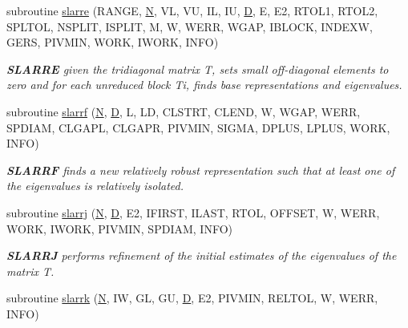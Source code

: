 \begin{DoxyCompactItemize}
subroutine \hyperlink{group__auxOTHERauxiliary_ga4a2b9dcf8e9c8f368fb6d39506781f46}{slarre} (R\+A\+N\+G\+E, \hyperlink{polmisc_8c_a0240ac851181b84ac374872dc5434ee4}{N}, V\+L, V\+U, I\+L, I\+U, \hyperlink{odrpack_8h_a7dae6ea403d00f3687f24a874e67d139}{D}, E, E2, R\+T\+O\+L1, R\+T\+O\+L2, S\+P\+L\+T\+O\+L, N\+S\+P\+L\+I\+T, I\+S\+P\+L\+I\+T, M, W, W\+E\+R\+R, W\+G\+A\+P, I\+B\+L\+O\+C\+K, I\+N\+D\+E\+X\+W, G\+E\+R\+S, P\+I\+V\+M\+I\+N, W\+O\+R\+K, I\+W\+O\+R\+K, I\+N\+F\+O)
\begin{DoxyCompactList}\small\item\em {\bfseries S\+L\+A\+R\+R\+E} given the tridiagonal matrix T, sets small off-\/diagonal elements to zero and for each unreduced block Ti, finds base representations and eigenvalues. \end{DoxyCompactList}\item 
subroutine \hyperlink{group__auxOTHERauxiliary_gaaf557670fb7f0616fb74b6af8cae353b}{slarrf} (\hyperlink{polmisc_8c_a0240ac851181b84ac374872dc5434ee4}{N}, \hyperlink{odrpack_8h_a7dae6ea403d00f3687f24a874e67d139}{D}, L, L\+D, C\+L\+S\+T\+R\+T, C\+L\+E\+N\+D, W, W\+G\+A\+P, W\+E\+R\+R, S\+P\+D\+I\+A\+M, C\+L\+G\+A\+P\+L, C\+L\+G\+A\+P\+R, P\+I\+V\+M\+I\+N, S\+I\+G\+M\+A, D\+P\+L\+U\+S, L\+P\+L\+U\+S, W\+O\+R\+K, I\+N\+F\+O)
\begin{DoxyCompactList}\small\item\em {\bfseries S\+L\+A\+R\+R\+F} finds a new relatively robust representation such that at least one of the eigenvalues is relatively isolated. \end{DoxyCompactList}\item 
subroutine \hyperlink{group__auxOTHERauxiliary_ga86d0ea9b6f2d76876a8f0c0e1a12868c}{slarrj} (\hyperlink{polmisc_8c_a0240ac851181b84ac374872dc5434ee4}{N}, \hyperlink{odrpack_8h_a7dae6ea403d00f3687f24a874e67d139}{D}, E2, I\+F\+I\+R\+S\+T, I\+L\+A\+S\+T, R\+T\+O\+L, O\+F\+F\+S\+E\+T, W, W\+E\+R\+R, W\+O\+R\+K, I\+W\+O\+R\+K, P\+I\+V\+M\+I\+N, S\+P\+D\+I\+A\+M, I\+N\+F\+O)
\begin{DoxyCompactList}\small\item\em {\bfseries S\+L\+A\+R\+R\+J} performs refinement of the initial estimates of the eigenvalues of the matrix T. \end{DoxyCompactList}\item 
subroutine \hyperlink{group__auxOTHERauxiliary_gac34836aa49da0ba1ef397af5a5590e22}{slarrk} (\hyperlink{polmisc_8c_a0240ac851181b84ac374872dc5434ee4}{N}, I\+W, G\+L, G\+U, \hyperlink{odrpack_8h_a7dae6ea403d00f3687f24a874e67d139}{D}, E2, P\+I\+V\+M\+I\+N, R\+E\+L\+T\+O\+L, W, W\+E\+R\+R, I\+N\+F\+O)

\end{DoxyCompactItemize}
